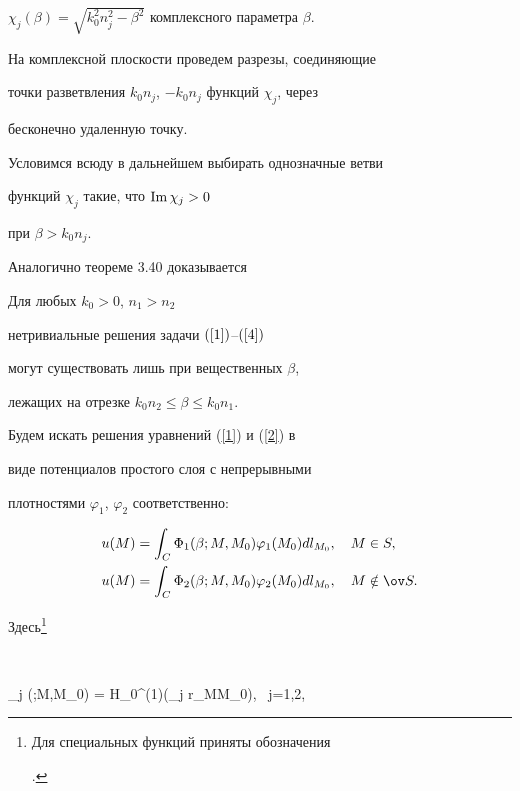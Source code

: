 $\chi_j(\beta)=\sqrt{k_0^2n_j^2-\beta^2}$ комплексного параметра $\beta$.


На комплексной плоскости проведем разрезы, соединяющие


точки разветвления $k_0n_j$, $-k_0n_j$ функций $\chi_j$, через


бесконечно удаленную точку.


Условимся всюду в дальнейшем выбирать однозначные ветви


функций $\chi_j$ такие, что $\operatorname{Im}\chi_j > 0$ 


при $\beta > k_0n_j$.





Аналогично теореме 3.40 \cite{199603040001} доказывается


\begin{thm}


\label{t}


Для любых $k_0 > 0$, $n_1 > n_2$


нетривиальные решения задачи $(\ref{1})$--$(\ref{4})$


могут существовать лишь при вещественных $\beta$,


лежащих на отрезке $k_0n_2 \le \beta \le k_0n_1$.


\end{thm}





Будем искать решения уравнений (\ref{1}) и (\ref{2}) в 


виде потенциалов простого слоя \cite{199603040001} с непрерывными


плотностями $\varphi_1$, $\varphi_2$ соответственно:


\begin{align}


\label{pot1}


u(M)&=\int_C \Phi_1(\beta;M,M_0)\varphi_1 (M_0) dl_{M_0},\quad M \in S,\\


\label{pot2}


u(M)&=\int_C \Phi_2(\beta;M,M_0)\varphi_2(M_0)dl_{M_0},\quad M \notin \ov S.


\end{align}


Здесь\footnote{Для специальных функций приняты обозначения 


\cite{199603040011}.} 


$$


\Phi_j (\beta;M,M_0) =  H_0^{(1)}(\chi_j r_{MM_0}),\ \; j=1,2,



